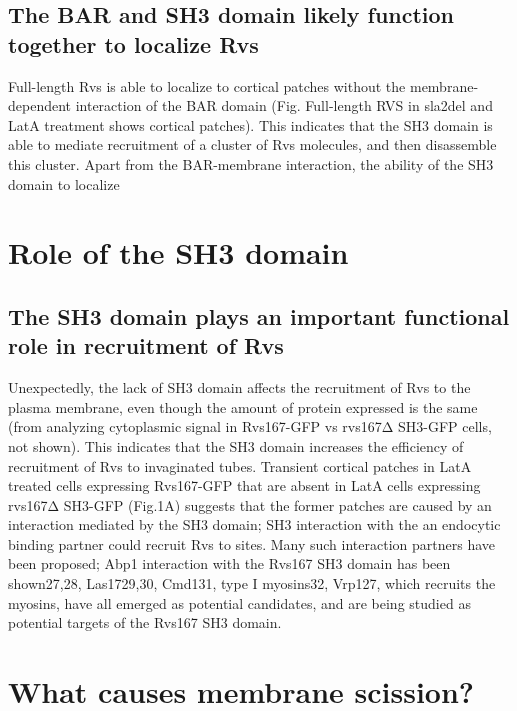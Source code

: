 \subsection{The BAR and SH3 domain likely function together to localize Rvs}
Full-length Rvs is able to localize to cortical patches without the membrane-dependent interaction of the BAR domain (Fig. Full-length RVS in sla2del and LatA treatment shows cortical patches). This indicates that the SH3 domain is able to mediate recruitment of a cluster of Rvs molecules, and then disassemble this cluster.  Apart from the BAR-membrane interaction, the ability of the SH3 domain to localize 

\section{Role of the SH3 domain}

\subsection{The SH3 domain plays an important functional role in recruitment of Rvs}
Unexpectedly, the lack of SH3 domain affects the recruitment of Rvs to the plasma membrane, even though the amount of protein expressed is the same (from analyzing cytoplasmic signal in Rvs167-GFP vs rvs167Δ SH3-GFP cells, not shown). This indicates that the SH3 domain increases the efficiency of recruitment of Rvs to invaginated tubes. Transient cortical patches in LatA treated cells expressing Rvs167-GFP that are absent in LatA cells expressing rvs167Δ SH3-GFP (Fig.1A) suggests that the former patches are caused by an interaction mediated by the SH3 domain; SH3 interaction with the an endocytic binding partner could recruit Rvs to sites. Many such interaction partners have been proposed; Abp1 interaction with the Rvs167 SH3 domain has been shown27,28, Las1729,30, Cmd131, type I myosins32, Vrp127, which recruits the myosins, have all emerged as potential candidates, and are being studied as potential targets of the Rvs167 SH3 domain.


\section{What causes membrane scission?}

